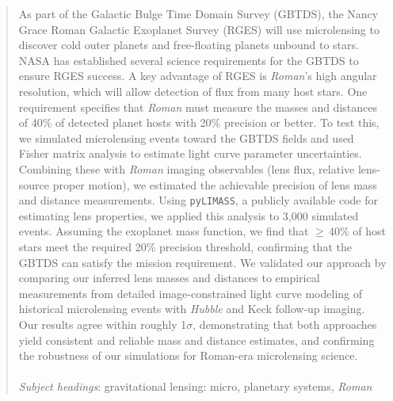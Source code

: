 \documentclass[twocolumn]{aastex631}
\begin{document}
\begin{abstract}

\small \noindent As part of the Galactic Bulge Time Domain Survey (GBTDS), the Nancy Grace Roman Galactic Exoplanet Survey (RGES) will use microlensing to discover cold outer planets and free-floating planets unbound to stars. NASA has established several science requirements for the GBTDS to ensure RGES success. A key advantage of RGES is \textit{Roman}’s high angular resolution, which will allow detection of flux from many host stars. One requirement specifies that \textit{Roman} must measure the masses and distances of 40\% of detected planet hosts with 20\% precision or better. To test this, we simulated microlensing events toward the GBTDS fields and used Fisher matrix analysis to estimate light curve parameter uncertainties. Combining these with \textit{Roman} imaging observables (lens flux, relative lens-source proper motion), we estimated the achievable precision of lens mass and distance measurements. Using \texttt{pyLIMASS}, a publicly available code for estimating lens properties, we applied this analysis to 3,000 simulated events. Assuming the \cite{cassan:2012a} exoplanet mass function, we find that $\geq$\,40\% of host stars meet the required 20\% precision threshold, confirming that the GBTDS can satisfy the mission requirement. We validated our approach by comparing our inferred lens masses and distances to empirical measurements from detailed image-constrained light curve modeling of historical microlensing events with \textit{Hubble} and Keck follow-up imaging. Our results agree within roughly 1${\sigma}$, demonstrating that both approaches yield consistent and reliable mass and distance estimates, and confirming the robustness of our simulations for Roman-era microlensing science.
\\
\\
\textit{Subject headings}: gravitational lensing: micro, planetary systems, \textit{Roman} \\
\end{abstract}

\end{document}
